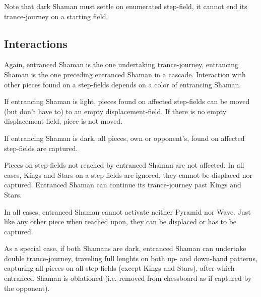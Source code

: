 \clearpage %

Note that dark Shaman must settle on enumerated step-field, it cannot end its
trance-journey on a starting field.


\subsection*{Interactions}
\label{sec:Conquest of Tlalocan/Trance-journey/Interactions}

Again, entranced Shaman is the one undertaking trance-journey, entrancing Shaman
is the one preceding entranced Shaman in a cascade. Interaction with other pieces
found on a step-fields depends on a color of entrancing Shaman.

If entrancing Shaman is light, pieces found on affected step-fields can be moved
(but don't have to) to an empty displacement-field. If there is no empty
displacement-field, piece is not moved.

If entrancing Shaman is dark, all pieces, own or opponent's, found on affected
step-fields are captured.

Pieces on step-fields not reached by entranced Shaman are not affected. In all
cases, Kings and Stars on a step-fields are ignored, they cannot be displaced
nor captured. Entranced Shaman can continue its trance-journey past Kings and Stars.

In all cases, entranced Shaman cannot activate neither Pyramid nor Wave. Just like
any other piece when reached upon, they can be displaced or has to be captured.

As a special case, if both Shamans are dark, entranced Shaman can undertake double
trance-journey, traveling full lenghts on both up- and down-hand patterns, capturing
all pieces on all step-fields (except Kings and Stars), after which entranced Shaman
is oblationed (i.e. removed from chessboard as if captured by the opponent).

\clearpage %

